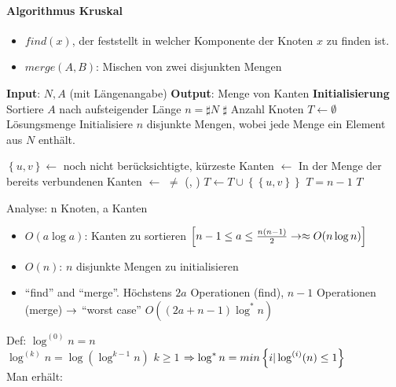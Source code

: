 \documentclass[a4paper]{scrartcl}
\begin{document}
\paragraph{Algorithmus Kruskal}
\begin{itemize}
\item $find(x)$, der feststellt in welcher Komponente der Knoten $x$ zu finden ist.
\item $merge(A,B)$: Mischen von zwei disjunkten Mengen
\end{itemize}

\begin{codebox}
\zi \textbf{Input}: $N,A$ (mit Längenangabe)
\zi \textbf{Output}: Menge von Kanten
\zi
\zi \textbf{Initialisierung}
\li Sortiere $A$ nach aufsteigender Länge
\li $n=\sharp N$ \Comment $\sharp$ Anzahl Knoten
\li $T \gets \emptyset$ \Comment Lösungsmenge
\li Initialisiere $n$ disjunkte Mengen, wobei jede Menge ein Element aus $N$ enthält.


\li \Repeat
\li	  $\left\{u,v\right\} \gets$ noch nicht berücksichtigte, kürzeste Kanten
\li	  {} $\gets$  \Comment In der Menge der bereits verbundenen Kanten
\li   {} $\gets$ 
\li	  \If 
           $\neq$ 
\li   \Then
			    (, )
      \End
\li   $T \gets T \cup \left\{ \left\{u,v\right\} \right\}$
\li \Until $T = n-1$
\li \Return $T$
\end{codebox}

Analyse: n Knoten, a Kanten

\begin{itemize}
\item $O(a \log{a})$: Kanten zu sortieren $\left[n-1 \leq a \leq \frac{n(n-1)}{2} \rightarrow \approx O(n \log{n})\right]$
\item $O(n)$: $n$ disjunkte Mengen zu initialisieren 
\item "`find"' and "`merge"'. Höchstens $2a$ Operationen (find), $n-1$ Operationen (merge) $\rightarrow$ "`worst case"' $O((2a+n-1) \log^{\ast}n)$\\
\end{itemize}

Def: $\log^{(0)}n = n$\\
$\log^{(k)}n = \log{(\log^{k-1}n)}$ $k \geq 1$ $\Rightarrow \log^{\ast}n = min\left\{i|\log^{(i)}(n)\leq 1\right\}$\\

Man erhält:\\
\end{document}
